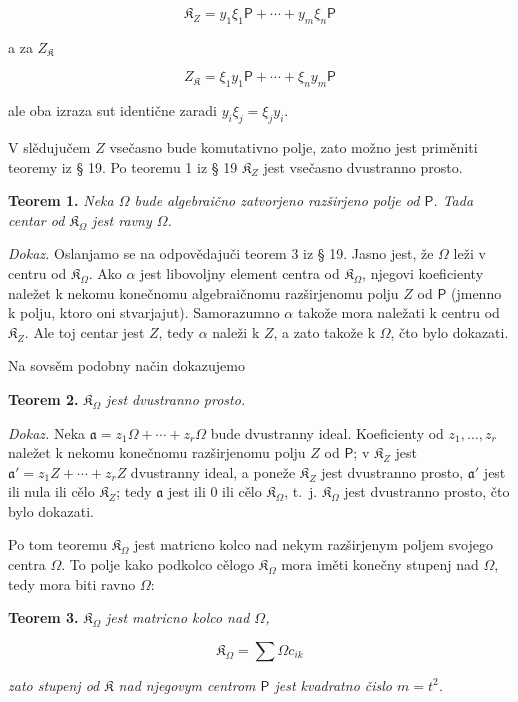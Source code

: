 \documentclass[11pt]{article}
\begin{document}
\[
\mathfrak K_Z=y_1\xi_1\mathsf P+\cdots+y_m\xi_n\mathsf P
\]

a za \(Z_{\mathfrak K}\)

\[
Z_{\mathfrak K}=\xi_1y_1\mathsf P+\cdots+\xi_ny_m\mathsf P
\]

ale oba izraza sut identične zaradi \(y_i\xi_j=\xi_jy_i\).

V slědujučem \(Z\) vsečasno bude komutativno polje, zato možno jest priměniti teoremy iz § 19. Po teoremu 1 iz § 19 \(\mathfrak K_Z\) jest vsečasno dvustranno prosto.

\textbf{Teorem 1.} \emph{Neka \(\Omega\) bude algebraično zatvorjeno razširjeno polje od \(\mathsf P\). Tada centar od \(\mathfrak K_\Omega\) jest ravny \(\Omega\).}

\emph{Dokaz.} Oslanjamo se na odpovědajuči teorem 3 iz § 19. Jasno jest, že \(\Omega\) leži v centru od \(\mathfrak K_\Omega\). Ako \(\alpha\) jest libovoljny element centra od \(\mathfrak K_\Omega\), njegovi koeficienty naležet k nekomu konečnomu algebraičnomu razširjenomu polju \(Z\) od \(\mathsf P\) (jmenno k polju, ktoro oni stvarjajut). Samorazumno \(\alpha\) takože mora naležati k centru od \(\mathfrak K_Z\). Ale toj centar jest \(Z\), tedy \(\alpha\) naleži k \(Z\), a zato takože k \(\Omega\), čto bylo dokazati.

Na sovsěm podobny način dokazujemo

\textbf{Teorem 2.} \emph{\(\mathfrak K_\Omega\) jest dvustranno prosto.}

\emph{Dokaz.} Neka \(\mathfrak a=z_1\Omega+\cdots+z_r\Omega\) bude dvustranny ideal. Koeficienty od \(z_1,\ldots,z_r\) naležet k nekomu konečnomu razširjenomu polju \(Z\) od \(\mathsf P\); v \(\mathfrak K_Z\) jest \(\mathfrak a'=z_1Z+\cdots+z_rZ\) dvustranny ideal, a poneže \(\mathfrak K_Z\) jest dvustranno prosto, \(\mathfrak a'\) jest ili nula ili cělo \(\mathfrak K_Z\); tedy \(\mathfrak a\) jest ili 0 ili cělo \(\mathfrak K_\Omega\), t.~j. \(\mathfrak K_\Omega\) jest dvustranno prosto, čto bylo dokazati.

Po tom teoremu \(\mathfrak K_\Omega\) jest matricno kolco nad nekym razširjenym poljem svojego centra \(\Omega\). To polje kako podkolco cělogo \(\mathfrak K_\Omega\) mora iměti konečny stupenj nad \(\Omega\), tedy mora biti ravno \(\Omega\):

\textbf{Teorem 3.} \emph{\(\mathfrak K_\Omega\) jest matricno kolco nad \(\Omega\),}

\[
\mathfrak K_\Omega=\sum\Omega c_{ik}
\]

\emph{zato stupenj od \(\mathfrak K\) nad njegovym centrom \(\mathsf P\) jest kvadratno čislo \(m=t^2\).}
\end{document}
